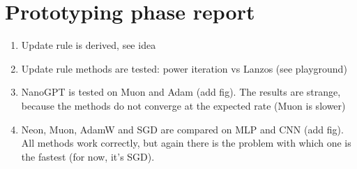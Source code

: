 \documentclass[]{scrartcl}
\begin{document}
\section{Prototyping phase report}
\begin{enumerate}
    \item Update rule is derived, see idea
    \item Update rule methods are tested: power iteration vs Lanzos (see playground)
    \item NanoGPT is tested on Muon and Adam (add fig). The results are strange, because the methods do not converge at the expected rate (Muon is slower)
    \item Neon, Muon, AdamW and SGD are compared on MLP and CNN (add fig). All methods work correctly, but again there is the problem with which one is the fastest (for now, it's SGD).
\end{enumerate}



\end{document}
